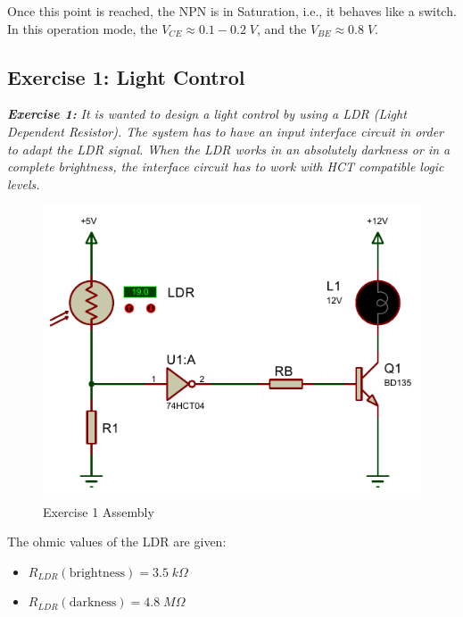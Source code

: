 Once this point is reached, the NPN is in Saturation, i.e., it behaves like a switch. In this operation mode, the $V_{CE} \approx 0.1-0.2 \; V$, and the $V_{BE} \approx 0.8 \; V$.

\subsection{Exercise 1: Light Control}

\textit{\textbf{Exercise 1:}} \textit{It is wanted to design a light control by using a LDR (Light Dependent Resistor). The system has to have an input interface circuit in order to adapt the LDR signal. When the LDR works in an absolutely darkness or in a complete brightness, the interface circuit has to work with HCT compatible logic levels.}

\begin{figure}[H]
    \centering
    \includegraphics[scale = 0.9]{Graphics/VHDL/Practice 8/EXERCISE_1/EX_1.PDF}
    \caption{Exercise 1 Assembly}
    \label{fig:EX_1}
\end{figure} \medskip

The ohmic values of the LDR are given:

\begin{itemize}
    \item $R_{LDR} \left( \text{brightness} \right) = 3.5 \; k\Omega$
    \item $R_{LDR} \left( \text{darkness} \right) = 4.8 \; M\Omega$
\end{itemize}

\clearpage

